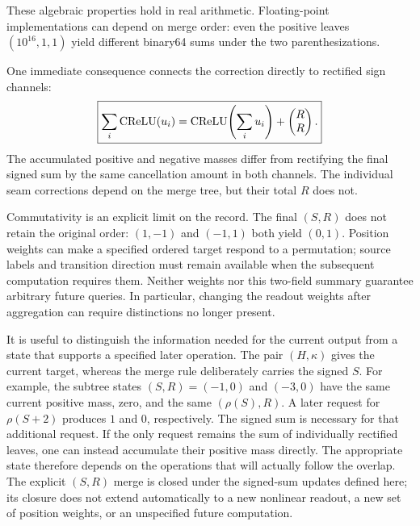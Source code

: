 These algebraic properties hold in real arithmetic. Floating-point
implementations can depend on merge order: even the positive leaves
\((10^{16},1,1)\) yield different binary64 sums under the two
parenthesizations.

One immediate consequence connects the correction directly to rectified
sign channels:
\begin{equation}
 \boxed{
 \sum_i\operatorname{CReLU}(u_i)
 =\operatorname{CReLU}\!\left(\sum_i u_i\right)
   +\begin{pmatrix}R\\R\end{pmatrix}.}
 \label{loc:crelu_mass}
\end{equation}
The accumulated positive and negative masses differ from rectifying the
final signed sum by the same cancellation amount in both channels.
The individual seam corrections depend on the merge tree, but their total
$R$ does not.

Commutativity is an explicit limit on the record. The final $(S,R)$ does not
retain the original order: $(1,-1)$ and $(-1,1)$ both yield $(0,1)$. Position
weights can make a specified ordered target respond to a permutation;
source labels and transition direction must remain available when the
subsequent computation requires them. Neither weights nor this two-field
summary guarantee arbitrary future queries. In particular, changing the
readout weights after aggregation can require distinctions no longer
present.

It is useful to distinguish the information needed for the current output
from a state that supports a specified later operation. The pair
$(H,\kappa)$ gives the current target, whereas the merge rule deliberately
carries the signed $S$. For example, the subtree states $(S,R)=(-1,0)$ and
$(-3,0)$ have the same current positive mass, zero, and the same
$(\rho(S),R)$. A later request for $\rho(S+2)$ produces $1$ and $0$,
respectively. The signed sum is necessary for that additional request.
If the only request remains the sum of individually rectified leaves, one
can instead accumulate their positive mass directly. The appropriate state
therefore depends on the operations that will actually follow the overlap.
The explicit $(S,R)$ merge is closed under the signed-sum updates defined
here; its closure does not extend automatically to a new nonlinear readout,
a new set of position weights, or an unspecified future computation.

